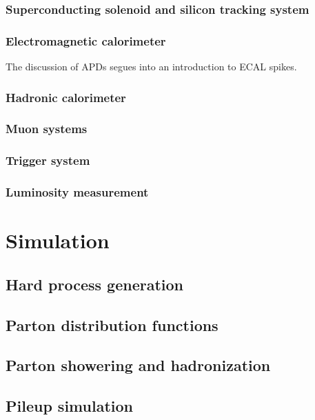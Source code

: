\documentclass[oneside, letterpaper, 12pt, oldfontcommands]{memoir}
\begin{document}
\subsection{Superconducting solenoid and silicon tracking system} \label{sec:LHCCMS_CMS_magnet_tracker}
\subsection{Electromagnetic calorimeter} \label{sec:LHCCMS_CMS_ECAL}
The discussion of APDs segues into an introduction to ECAL spikes.
\subsection{Hadronic calorimeter} \label{sec:LHCCMS_CMS_HCAL}
\subsection{Muon systems} \label{sec:LHCCMS_CMS_muon}
\subsection{Trigger system} \label{sec:LHCCMS_CMS_trigger}
\subsection{Luminosity measurement} \label{sec:LHCCMS_CMS_lumi}

\chapter{Simulation} \label{chap:simulation}
\section{Hard process generation} \label{sec:simulation_hard_process}
\section{Parton distribution functions} \label{sec:simulation_pdf}
\section{Parton showering and hadronization} \label{sec:simulation_parton_shower_hadronization}
\section{Pileup simulation} \label{sec:simulation_pileup}
\end{document}
